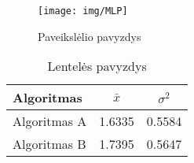\documentclass{VUMIFPSbakalaurinis}
\begin{document}

\begin{figure}[H]
    \centering
    \texttt{[image: img/MLP]}
    \caption{Paveikslėlio pavyzdys}
    \label{img:mlp}
\end{figure}



\begin{table}[H]\footnotesize
  \centering
  \caption{Lentelės pavyzdys}
  {\begin{tabular}{|l|c|c|} \hline
    Algoritmas & $\bar{x}$ & $\sigma^{2}$ \\
    \hline
    Algoritmas A  & 1.6335    & 0.5584       \\
    Algoritmas B  & 1.7395    & 0.5647       \\
    \hline
  \end{tabular}}
  \label{tab:table example}
\end{table}
\end{document}
